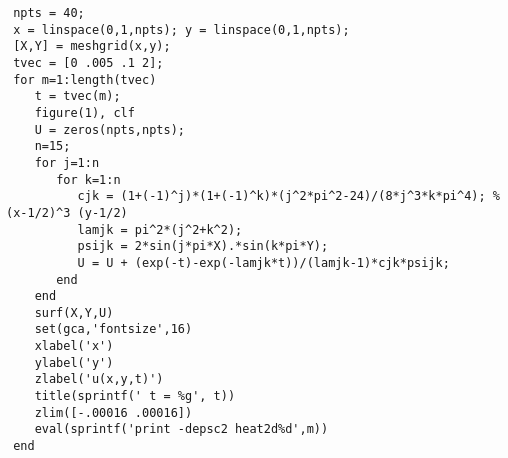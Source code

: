 {\small \begin{verbatim}
 npts = 40;
 x = linspace(0,1,npts); y = linspace(0,1,npts);
 [X,Y] = meshgrid(x,y);
 tvec = [0 .005 .1 2];
 for m=1:length(tvec)
    t = tvec(m);
    figure(1), clf
    U = zeros(npts,npts);
    n=15;
    for j=1:n
       for k=1:n
          cjk = (1+(-1)^j)*(1+(-1)^k)*(j^2*pi^2-24)/(8*j^3*k*pi^4); %  (x-1/2)^3 (y-1/2)
          lamjk = pi^2*(j^2+k^2);
          psijk = 2*sin(j*pi*X).*sin(k*pi*Y);
          U = U + (exp(-t)-exp(-lamjk*t))/(lamjk-1)*cjk*psijk;
       end
    end
    surf(X,Y,U)
    set(gca,'fontsize',16)
    xlabel('x')
    ylabel('y')
    zlabel('u(x,y,t)')
    title(sprintf(' t = %g', t))
    zlim([-.00016 .00016])
    eval(sprintf('print -depsc2 heat2d%d',m))
 end
\end{verbatim}}
